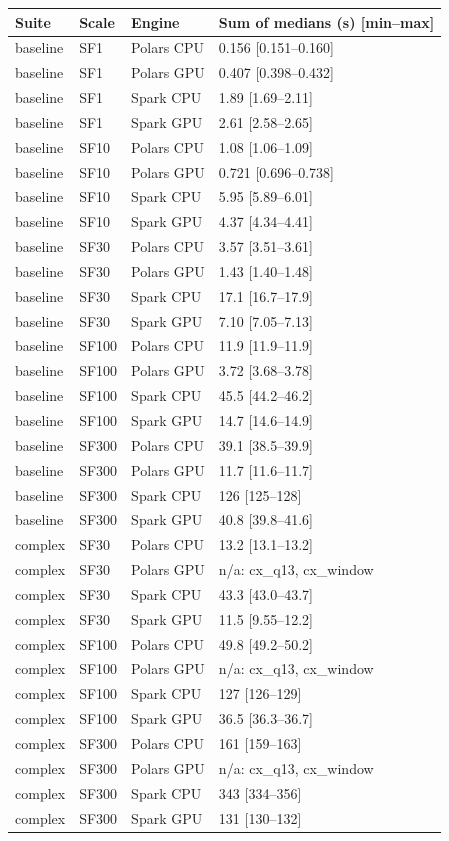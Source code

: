 \begin{tabular}{llll}
\toprule
Suite & Scale & Engine & Sum of medians (s) [min--max] \\
\midrule
baseline & SF1 & Polars CPU & 0.156 [0.151--0.160] \\
baseline & SF1 & Polars GPU & 0.407 [0.398--0.432] \\
baseline & SF1 & Spark CPU & 1.89 [1.69--2.11] \\
baseline & SF1 & Spark GPU & 2.61 [2.58--2.65] \\
baseline & SF10 & Polars CPU & 1.08 [1.06--1.09] \\
baseline & SF10 & Polars GPU & 0.721 [0.696--0.738] \\
baseline & SF10 & Spark CPU & 5.95 [5.89--6.01] \\
baseline & SF10 & Spark GPU & 4.37 [4.34--4.41] \\
baseline & SF30 & Polars CPU & 3.57 [3.51--3.61] \\
baseline & SF30 & Polars GPU & 1.43 [1.40--1.48] \\
baseline & SF30 & Spark CPU & 17.1 [16.7--17.9] \\
baseline & SF30 & Spark GPU & 7.10 [7.05--7.13] \\
baseline & SF100 & Polars CPU & 11.9 [11.9--11.9] \\
baseline & SF100 & Polars GPU & 3.72 [3.68--3.78] \\
baseline & SF100 & Spark CPU & 45.5 [44.2--46.2] \\
baseline & SF100 & Spark GPU & 14.7 [14.6--14.9] \\
baseline & SF300 & Polars CPU & 39.1 [38.5--39.9] \\
baseline & SF300 & Polars GPU & 11.7 [11.6--11.7] \\
baseline & SF300 & Spark CPU & 126 [125--128] \\
baseline & SF300 & Spark GPU & 40.8 [39.8--41.6] \\
complex & SF30 & Polars CPU & 13.2 [13.1--13.2] \\
complex & SF30 & Polars GPU & n/a: cx\_q13, cx\_window \\
complex & SF30 & Spark CPU & 43.3 [43.0--43.7] \\
complex & SF30 & Spark GPU & 11.5 [9.55--12.2] \\
complex & SF100 & Polars CPU & 49.8 [49.2--50.2] \\
complex & SF100 & Polars GPU & n/a: cx\_q13, cx\_window \\
complex & SF100 & Spark CPU & 127 [126--129] \\
complex & SF100 & Spark GPU & 36.5 [36.3--36.7] \\
complex & SF300 & Polars CPU & 161 [159--163] \\
complex & SF300 & Polars GPU & n/a: cx\_q13, cx\_window \\
complex & SF300 & Spark CPU & 343 [334--356] \\
complex & SF300 & Spark GPU & 131 [130--132] \\
\bottomrule
\end{tabular}
